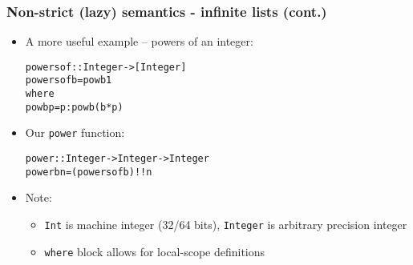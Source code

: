 \documentclass[final,handout]{beamer}
\begin{document}
\begin{frame}[fragile]
    \frametitle{Non-strict (lazy) semantics - infinite lists (cont.)}

    \begin{itemize}
        \item<1-> A more useful example -- powers of an integer:
            \begin{alltt}
    powersof :: Integer -> [Integer]
    powersof b  = pow b 1
        where
            pow b p = p : pow b (b * p)
            \end{alltt}
        \item<4-> Our \texttt{power} function:
            \begin{alltt}
    power :: Integer -> Integer -> Integer
    power b n = (powersof b) !! n
            \end{alltt}

        
        \item<2-> {\color{green} Note:}
            \begin{itemize}
                \item \texttt{Int} is machine integer (32/64 bits),
                    \texttt{Integer} is arbitrary precision integer
                \item \texttt{where} block allows for local-scope definitions

            \end{itemize}
    \end{itemize}

\end{frame}
\end{document}
